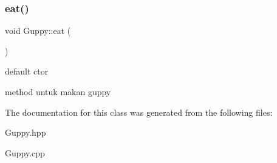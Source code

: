 \subsubsection{\texorpdfstring{eat()}{eat()}}
{\footnotesize\ttfamily void Guppy\+::eat (\begin{DoxyParamCaption}{ }\end{DoxyParamCaption})}



default ctor 

method untuk makan guppy 

The documentation for this class was generated from the following files\+:\begin{DoxyCompactItemize}
\item 
Guppy.\+hpp\item 
Guppy.\+cpp\end{DoxyCompactItemize}
